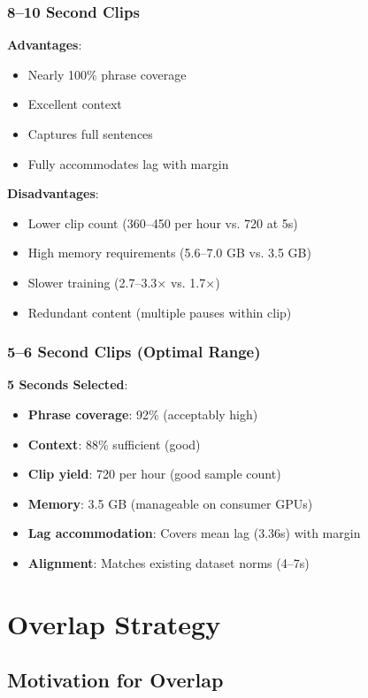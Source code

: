 \documentclass[11pt,a4paper]{article}
\begin{document}
\subsubsection{8--10 Second Clips}

\textbf{Advantages}:
\begin{itemize}
    \item Nearly 100\% phrase coverage
    \item Excellent context
    \item Captures full sentences
    \item Fully accommodates lag with margin
\end{itemize}

\textbf{Disadvantages}:
\begin{itemize}
    \item Lower clip count (360--450 per hour vs. 720 at 5s)
    \item High memory requirements (5.6--7.0 GB vs. 3.5 GB)
    \item Slower training (2.7--3.3$\times$ vs. 1.7$\times$)
    \item Redundant content (multiple pauses within clip)
\end{itemize}

\subsubsection{5--6 Second Clips (Optimal Range)}

\textbf{5 Seconds Selected}:
\begin{itemize}
    \item \textbf{Phrase coverage}: 92\% (acceptably high)
    \item \textbf{Context}: 88\% sufficient (good)
    \item \textbf{Clip yield}: 720 per hour (good sample count)
    \item \textbf{Memory}: 3.5 GB (manageable on consumer GPUs)
    \item \textbf{Lag accommodation}: Covers mean lag (3.36s) with margin
    \item \textbf{Alignment}: Matches existing dataset norms (4--7s)
\end{itemize}

\section{Overlap Strategy}

\subsection{Motivation for Overlap}
\end{document}
